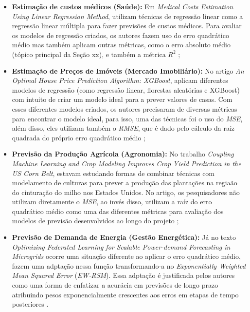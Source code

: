 \begin{itemize}
    \item \textbf{Estimação de custos médicos (Saúde):} Em \textit{Medical Costs Estimation Using Linear Regression Method}, \textcite{MedicalCostsEstimationUsingLR} utilizam técnicas de regressão linear como a regressão linear múltipla para fazer previsões de custos médicos. Para avaliar os modelos de regressão criados, os autores fazem uso do erro quadrático médio mas também aplicam outras métricas, como o erro absoluto médio (tópico principal da Seção xx), e também a métrica $R^2$ \parencite{MedicalCostsEstimationUsingLR};
    \item \textbf{Estimação de Preços de Imóveis (Mercado Imobiliário):} No artigo \textit{An Optimal House Price Prediction Algorithm: XGBoost}, \textcite{OptimalHousePricePrediction} aplicam diferentes modelos de regressão (como regressão linear, florestas aleatórias e XGBoost) com intuito de criar um modelo ideal para a prever valores de casas. Com esses diferentes modelos criados, os autores precisaram de diversas métricas para encontrar o modelo ideal, para isso, uma das técnicas foi o uso do \textit{MSE}, além disso, eles utilizam também o \textit{RMSE}, que é dado pelo cálculo da raíz quadrada do próprio erro quadrático médio \parencite{OptimalHousePricePrediction};
    \item \textbf{Previsão da Produção Agrícola (Agronomia):} No trabalho \textit{Coupling Machine Learning and Crop Modeling Improves Crop Yield Prediction in the US Corn Belt}, \textcite{CouplingMachineLearningAndCropModeling} estavam estudando formas de combinar técnicas com modelamento de culturas para prever a produção das plantações na regiaão do cinturação do milho nos Estados Unidos. No artigo, os pesquisadores não utilizam diretamente o \textit{MSE}, ao invés disso, utilizam a raíz do erro quadrático médio como uma das diferentes métricas para avaliação dos modelos de previsão desenvolvidos ao longo do projeto \parencite{CouplingMachineLearningAndCropModeling};
    \item \textbf{Previsão de Demanda de Energia (Gestão Energética):} Já no texto \textit{Optimizing Federated Learning for Scalable Power-demand Forecasting in Microgrids} ocorre uma situação diferente ao aplicar o erro quadrático médio, \textcite{OptimizingFL} fazem uma adptação nessa função transformando-a no \textit{Exponentially Weighted Mean Squared Error} (\textit{EW-RSM}). Essa adptação é justificada pelos autores como uma forma de enfatizar a acurácia em previsões de longo prazo atribuindo pesos exponencialmente crescentes aos erros em etapas de tempo posteriores \parencite{OptimizingFL}.
\end{itemize}

